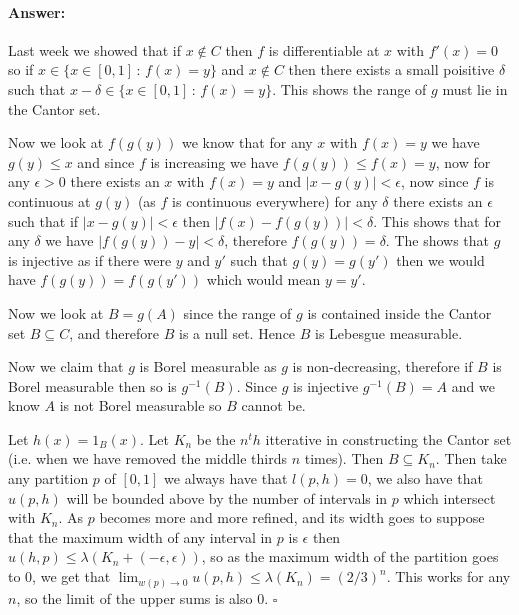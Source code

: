 \documentclass[11pt]{article}
\theoremstyle{definition}
\theoremstyle{remark}
\newenvironment{ans}{\paragraph{Answer:}}{\hfill$\square$\vspace{10pt}}
\begin{document}
\begin{ans}
Last week we showed that if $x \notin C$ then $f$ is differentiable at $x$ with $f'(x)=0$ so if $x \in \{x \in [0,1]\,:\, f(x) = y\}$ and $x \notin C$ then there exists a small poisitive $\delta$ such that $x-\delta \in \{x \in [0,1]\,:\, f(x) = y\}$. This shows the range of $g$ must lie in the Cantor set. 

Now we look at $f(g(y))$ we know that for any $x$ with $f(x) = y$ we have $g(y) \leq x$ and since $f$ is increasing we have $f(g(y)) \leq f(x) = y$, now for any $\epsilon>0$ there exists an $x$ with $f(x) =y$ and $|x-g(y)|<\epsilon$, now since $f$ is continuous at $g(y)$ (as $f$ is continuous everywhere) for any $\delta$ there exists an $\epsilon$ such that if $|x -g(y)| < \epsilon$ then $|f(x) - f(g(y))| < \delta$. This shows that for any $\delta$ we have $|f(g(y))-y| < \delta$, therefore $f(g(y)) = \delta$. The shows that $g$ is injective as if there were $y$ and $y'$ such that $g(y) = g(y')$ then we would have $f(g(y)) = f(g(y'))$ which would mean $y = y'$.

Now we look at $B=g(A)$ since the range of $g$ is contained inside the Cantor set $B \subseteq C$, and therefore $B$ is a null set. Hence $B$ is Lebesgue measurable.

Now we claim that $g$ is Borel measurable as $g$ is non-decreasing, therefore if $B$ is Borel measurable then so is $g^{-1}(B)$. Since $g$ is injective $g^{-1}(B) =A$ and we know $A$ is not Borel measurable so $B$ cannot be.

Let $h(x) =1_B(x)$. Let $K_n$ be the $n^th$ itterative in constructing the Cantor set (i.e. when we have removed the middle thirds $n$ times). Then $B \subseteq K_n$. Then take any partition $p$ of $[0,1]$ we always have that $l(p,h)=0$, we also have that $u(p,h)$ will be bounded above by the number of intervals in $p$ which intersect with $K_n$. As $p$ becomes more and more refined, and its width goes to suppose that the maximum width of any interval in $p$ is $\epsilon$ then $u(h,p) \leq \lambda(K_n + (-\epsilon, \epsilon))$, so as the maximum width of the partition goes to 0, we get that $\lim_{w(p) \rightarrow 0}u(p,h) \leq \lambda(K_n) = (2/3)^n$. This works for any $n$, so the limit of the upper sums is also 0.
\end{ans}
\end{document}
